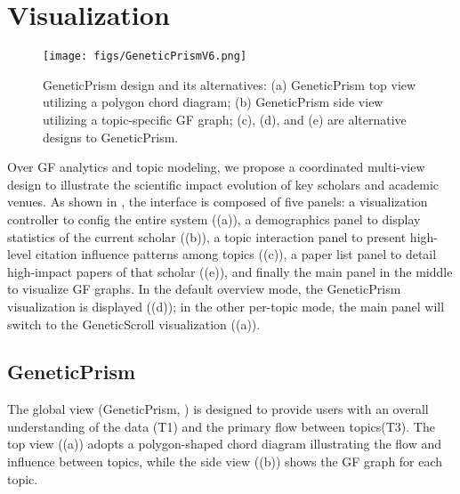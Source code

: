 \section{Visualization}
\label{sec:Vis}

\begin{figure*}[tb]
  \centering
  \texttt{[image: figs/GeneticPrismV6.png]}
  \caption{%
  	GeneticPrism design and its alternatives: (a) GeneticPrism top view utilizing a polygon chord diagram; (b) GeneticPrism side view utilizing a topic-specific GF graph; (c), (d), and (e) are alternative designs to GeneticPrism.%
  }
  \label{fig:GeneticPrism}
\end{figure*}

Over GF analytics and topic modeling, we propose a coordinated multi-view design to illustrate the scientific impact evolution of key scholars and academic venues. As shown in , the interface is composed of five panels: a visualization controller to config the entire system ((a)), a demographics panel to display statistics of the current scholar ((b)), a topic interaction panel to present high-level citation influence patterns among topics ((c)), a paper list panel to detail high-impact papers of that scholar ((e)), and finally the main panel in the middle to visualize GF graphs. In the default overview mode, the GeneticPrism visualization is displayed ((d)); in the other per-topic mode, the main panel will switch to the GeneticScroll visualization ((a)).


\subsection{GeneticPrism}

The global view (GeneticPrism, ) is designed to provide users with an overall understanding of the data (T1) and the primary flow between topics(T3). The top view ((a)) adopts a polygon-shaped chord diagram illustrating the flow and influence between topics, while the side view ((b)) shows the GF graph for each topic.

